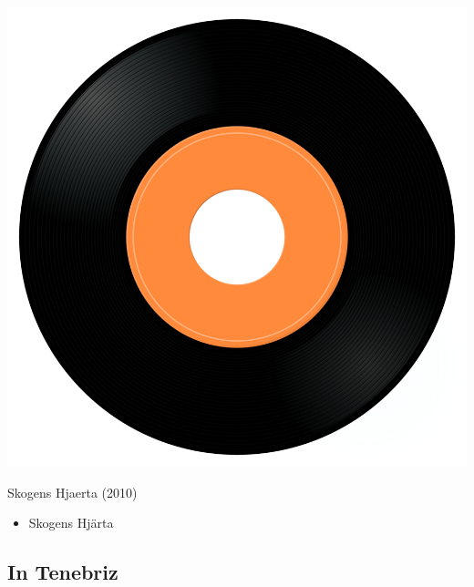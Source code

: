 \begin{minipage}[t]{0.25\textwidth}
\captionsetup{type=figure}
\includegraphics[width=\textwidth]{Images/cover.png}
\caption*{Skogens Hjaerta (2010)}
\end{minipage}
\begin{minipage}[t]{0.25\textwidth}\vspace{0pt}
\begin{itemize}[nosep,leftmargin=1em,labelwidth=*,align=left]
	\setlength{\itemsep}{0pt}
	\item Skogens Hjärta
\end{itemize}
\end{minipage}

\subsection{In Tenebriz}

